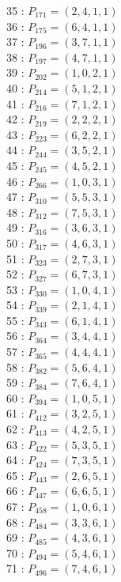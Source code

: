 \documentclass{article}
\begin{document}
{\begin{multicols}{3}
35 : $P_{171}=( 2, 4, 1, 1 )$\\
36 : $P_{175}=( 6, 4, 1, 1 )$\\
37 : $P_{196}=( 3, 7, 1, 1 )$\\
38 : $P_{197}=( 4, 7, 1, 1 )$\\
39 : $P_{202}=( 1, 0, 2, 1 )$\\
40 : $P_{214}=( 5, 1, 2, 1 )$\\
41 : $P_{216}=( 7, 1, 2, 1 )$\\
42 : $P_{219}=( 2, 2, 2, 1 )$\\
43 : $P_{223}=( 6, 2, 2, 1 )$\\
44 : $P_{244}=( 3, 5, 2, 1 )$\\
45 : $P_{245}=( 4, 5, 2, 1 )$\\
46 : $P_{266}=( 1, 0, 3, 1 )$\\
47 : $P_{310}=( 5, 5, 3, 1 )$\\
48 : $P_{312}=( 7, 5, 3, 1 )$\\
49 : $P_{316}=( 3, 6, 3, 1 )$\\
50 : $P_{317}=( 4, 6, 3, 1 )$\\
51 : $P_{323}=( 2, 7, 3, 1 )$\\
52 : $P_{327}=( 6, 7, 3, 1 )$\\
53 : $P_{330}=( 1, 0, 4, 1 )$\\
54 : $P_{339}=( 2, 1, 4, 1 )$\\
55 : $P_{343}=( 6, 1, 4, 1 )$\\
56 : $P_{364}=( 3, 4, 4, 1 )$\\
57 : $P_{365}=( 4, 4, 4, 1 )$\\
58 : $P_{382}=( 5, 6, 4, 1 )$\\
59 : $P_{384}=( 7, 6, 4, 1 )$\\
60 : $P_{394}=( 1, 0, 5, 1 )$\\
61 : $P_{412}=( 3, 2, 5, 1 )$\\
62 : $P_{413}=( 4, 2, 5, 1 )$\\
63 : $P_{422}=( 5, 3, 5, 1 )$\\
64 : $P_{424}=( 7, 3, 5, 1 )$\\
65 : $P_{443}=( 2, 6, 5, 1 )$\\
66 : $P_{447}=( 6, 6, 5, 1 )$\\
67 : $P_{458}=( 1, 0, 6, 1 )$\\
68 : $P_{484}=( 3, 3, 6, 1 )$\\
69 : $P_{485}=( 4, 3, 6, 1 )$\\
70 : $P_{494}=( 5, 4, 6, 1 )$\\
71 : $P_{496}=( 7, 4, 6, 1 )$\\

\end{multicols}}
\end{document}
